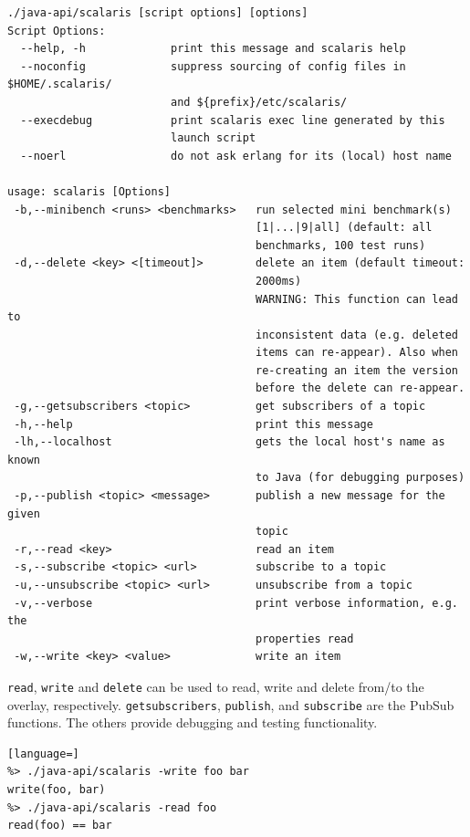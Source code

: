 \documentclass[a4paper]{scrreprt}
\newcommand{\code}[1]{\lstinline[basicstyle=\ttfamily]!#1!}
\begin{document}
\begin{lstlisting}[language={}]
%> ./java-api/scalaris --help
./java-api/scalaris [script options] [options]
Script Options:
  --help, -h             print this message and scalaris help
  --noconfig             suppress sourcing of config files in $HOME/.scalaris/
                         and ${prefix}/etc/scalaris/
  --execdebug            print scalaris exec line generated by this
                         launch script
  --noerl                do not ask erlang for its (local) host name
  
usage: scalaris [Options]
 -b,--minibench <runs> <benchmarks>   run selected mini benchmark(s)
                                      [1|...|9|all] (default: all
                                      benchmarks, 100 test runs)
 -d,--delete <key> <[timeout]>        delete an item (default timeout:
                                      2000ms)
                                      WARNING: This function can lead to
                                      inconsistent data (e.g. deleted
                                      items can re-appear). Also when
                                      re-creating an item the version
                                      before the delete can re-appear.
 -g,--getsubscribers <topic>          get subscribers of a topic
 -h,--help                            print this message
 -lh,--localhost                      gets the local host's name as known
                                      to Java (for debugging purposes)
 -p,--publish <topic> <message>       publish a new message for the given
                                      topic
 -r,--read <key>                      read an item
 -s,--subscribe <topic> <url>         subscribe to a topic
 -u,--unsubscribe <topic> <url>       unsubscribe from a topic
 -v,--verbose                         print verbose information, e.g. the
                                      properties read
 -w,--write <key> <value>             write an item
\end{lstlisting}

\code{read}, \code{write} and \code{delete} can be used to read, write
and delete from/to the overlay, respectively. \code{getsubscribers},
\code{publish}, and \code{subscribe} are the PubSub functions. The others
provide debugging and testing functionality.

\begin{lstlisting}[language=]
%> ./java-api/scalaris -write foo bar
write(foo, bar)
%> ./java-api/scalaris -read foo
read(foo) == bar
\end{lstlisting}
\end{document}
